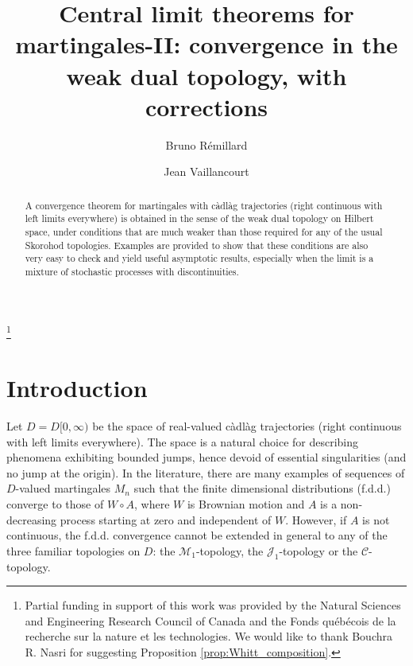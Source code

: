 \documentclass[final]{amsart}
\theoremstyle{definition}
\numberwithin{equation}{section}
\begin{document}
\title[CLT for martingales-II: convergence in weak dual topology]{Central limit theorems for martingales-II: convergence in the weak dual topology, with corrections}

\author{Bruno R\'{e}millard}
\address{GERAD and Department of Decision Sciences, HEC Montr\'{e}al\\
3000, che\-min de la C\^{o}\-te-Sain\-te-Ca\-the\-ri\-ne,
Montr\'{e}al (Qu\'{e}\-bec), Canada H3T 2A7}

\author{Jean Vaillancourt}
\address{Department of Decision Sciences, HEC Montr\'{e}al\\
3000, che\-min de la C\^{o}\-te-Sain\-te-Ca\-the\-ri\-ne,
Montr\'{e}al (Qu\'{e}\-bec), Canada H3T 2A7} 

\thanks{Partial funding in support of this work was provided by the Natural
Sciences and Engineering Research Council of Canada and  the Fonds
qu\'e\-b\'e\-cois de la re\-cher\-che sur la na\-tu\-re et les
tech\-no\-lo\-gies.
We would like to thank Bouchra R. Nasri for suggesting Proposition \ref{prop:Whitt_composition}.}


\begin{abstract}
A convergence theorem for martingales with c\`adl\`ag trajectories (right continuous with left limits everywhere) is obtained in the sense of the weak dual topology on Hilbert space, under conditions that are much weaker than those required for any of the usual Skorohod topologies.
Examples are provided to show that these conditions are also very easy to check and yield
useful asymptotic results, especially when the limit is a mixture of stochastic processes with discontinuities.
\end{abstract}



\maketitle

\section{Introduction}
Let $D= D[0,\infty)$ be the space of real-valued c\`adl\`ag trajectories (right continuous with left limits everywhere).
The space is a natural choice for describing phenomena exhibiting bounded jumps, hence devoid
of essential singularities (and no jump at the origin).  In the literature, there are many examples of sequences of
$D$-valued martingales $M_n$ such that the finite dimensional distributions (f.d.d.) converge to those of $W\circ A$,
where $W$ is Brownian motion and $A$ is a non-decreasing process starting at zero and independent of $W$.
However, if $A$ is not continuous, the f.d.d. convergence cannot be extended in general to any of the three familiar topologies on $D$:
the $\mathcal{M}_1$-topology, the $\mathcal{J}_1$-topology or the $\mathcal{C}$-topology.
\end{document}
